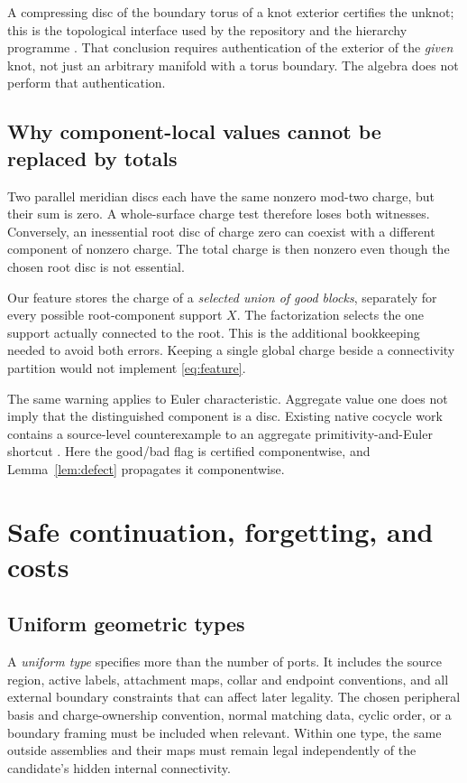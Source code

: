 \documentclass[11pt,letterpaper]{article}
\theoremstyle{definition}
\begin{document}
A compressing disc of the boundary torus of a knot exterior certifies the unknot; this is the topological interface used by the repository and the hierarchy programme \cite{repo,lackenby}. That conclusion requires authentication of the exterior of the \emph{given} knot, not just an arbitrary manifold with a torus boundary. The algebra does not perform that authentication.

\subsection{Why component-local values cannot be replaced by totals}
Two parallel meridian discs each have the same nonzero mod-two charge, but their sum is zero. A whole-surface charge test therefore loses both witnesses. Conversely, an inessential root disc of charge zero can coexist with a different component of nonzero charge. The total charge is then nonzero even though the chosen root disc is not essential.

Our feature stores the charge of a \emph{selected union of good blocks}, separately for every possible root-component support $X$. The factorization selects the one support actually connected to the root. This is the additional bookkeeping needed to avoid both errors. Keeping a single global charge beside a connectivity partition would not implement \eqref{eq:feature}.

The same warning applies to Euler characteristic. Aggregate value one does not imply that the distinguished component is a disc. Existing native cocycle work contains a source-level counterexample to an aggregate primitivity-and-Euler shortcut \cite{cocycle}. Here the good/bad flag is certified componentwise, and Lemma~\ref{lem:defect} propagates it componentwise.

\section{Safe continuation, forgetting, and costs}\label{sec:context}
\subsection{Uniform geometric types}
A \emph{uniform type} specifies more than the number of ports. It includes the source region, active labels, attachment maps, collar and endpoint conventions, and all external boundary constraints that can affect later legality. The chosen peripheral basis and charge-ownership convention, normal matching data, cyclic order, or a boundary framing must be included when relevant. Within one type, the same outside assemblies and their maps must remain legal independently of the candidate's hidden internal connectivity.
\end{document}
